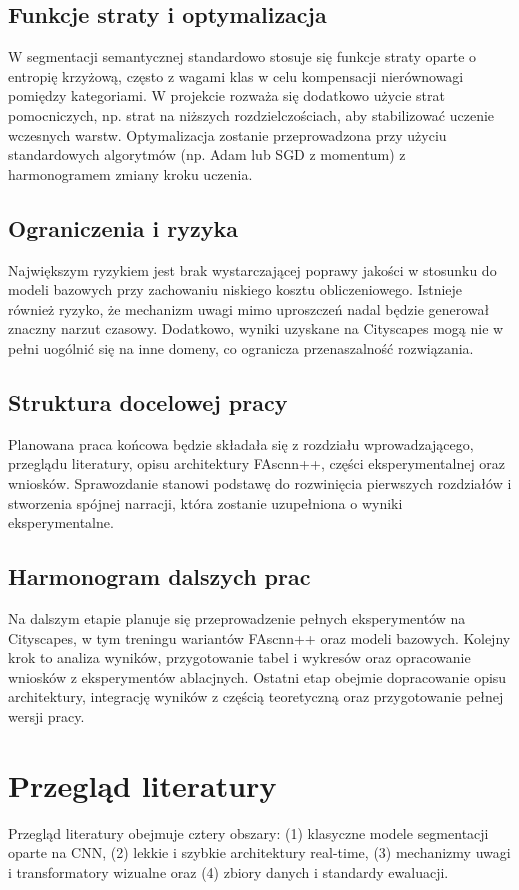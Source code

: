 \documentclass[12pt,oneside,a4paper]{report}
\begin{document}
\section{Funkcje straty i optymalizacja}
W segmentacji semantycznej standardowo stosuje się funkcje straty oparte o
entropię krzyżową, często z wagami klas w celu kompensacji nierównowagi
pomiędzy kategoriami. W projekcie rozważa się dodatkowo użycie strat pomocniczych,
np. strat na niższych rozdzielczościach, aby stabilizować uczenie wczesnych
warstw. Optymalizacja zostanie przeprowadzona przy użyciu standardowych
algorytmów (np. Adam lub SGD z momentum) z harmonogramem zmiany kroku uczenia.

\section{Ograniczenia i ryzyka}
Największym ryzykiem jest brak wystarczającej poprawy jakości w stosunku do
modeli bazowych przy zachowaniu niskiego kosztu obliczeniowego. Istnieje również
ryzyko, że mechanizm uwagi mimo uproszczeń nadal będzie generował znaczny narzut
czasowy. Dodatkowo, wyniki uzyskane na Cityscapes mogą nie w pełni uogólnić się
na inne domeny, co ogranicza przenaszalność rozwiązania.

\section{Struktura docelowej pracy}
Planowana praca końcowa będzie składała się z rozdziału wprowadzającego,
przeglądu literatury, opisu architektury FAscnn++, części eksperymentalnej oraz
wniosków. Sprawozdanie stanowi podstawę do rozwinięcia pierwszych rozdziałów
i stworzenia spójnej narracji, która zostanie uzupełniona o wyniki eksperymentalne.

\section{Harmonogram dalszych prac}
Na dalszym etapie planuje się przeprowadzenie pełnych eksperymentów na
Cityscapes, w tym treningu wariantów FAscnn++ oraz modeli bazowych. Kolejny krok
to analiza wyników, przygotowanie tabel i wykresów oraz opracowanie wniosków
z eksperymentów ablacjnych. Ostatni etap obejmie dopracowanie opisu architektury,
integrację wyników z częścią teoretyczną oraz przygotowanie pełnej wersji pracy.

\chapter{Przegląd literatury}
Przegląd literatury obejmuje cztery obszary: (1) klasyczne modele segmentacji
oparte na CNN, (2) lekkie i szybkie architektury real-time, (3) mechanizmy uwagi
i transformatory wizualne oraz (4) zbiory danych i standardy ewaluacji.
\end{document}
